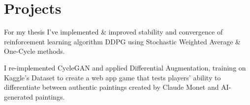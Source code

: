 \documentclass[]{CV}
\begin{document}
\begin{minipage}[t]{0.705\textwidth}
\section{Projects}
\begin{tightemize}

\item For my thesis I've implemented \& improved stability and convergence of reinforcement learning algorithm DDPG using Stochastic Weighted Average \& One-Cycle methods.

\end{tightemize}

\begin{tightemize}

\item I re-implemented CycleGAN and applied Differential Augmentation, training on Kaggle's Dataset to create a web app game that tests players' ability to differentiate between authentic paintings created by Claude Monet and AI-generated paintings.

\end{tightemize}
\sectionsep








%
%

\end{minipage} 
\end{document}
